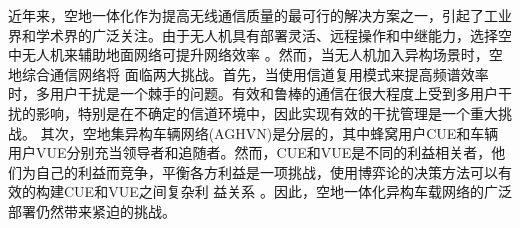近年来，空地一体化作为提高无线通信质量的最可行的解决方案之一，引起了工业界和学术界的广泛关注。由于无人机具有部署灵活、远程操作和中继能力，选择空中无人机来辅助地面网络可提升网络效率 \supercite{ACO}。然而，当无人机加入异构场景时，空地综合通信网络将
面临两大挑战。首先，当使用信道复用模式来提高频谱效率时，多用户干扰是一个棘手的问题。有效和鲁棒的通信在很大程度上受到多用户干扰的影响，特别是在不确定的信道环境中，因此实现有效的干扰管理是一个重大挑战\supercite{CCO}。 其次，空地集异构车辆网络(AGHVN)是分层的，其中蜂窝用户CUE和车辆用户VUE分别充当领导者和追随者。然而，CUE和VUE是不同的利益相关者，他们为自己的利益而竞争，平衡各方利益是一项挑战，使用博弈论的决策方法可以有效的构建CUE和VUE之间复杂利
益关系 \supercite{胡益恺智能车辆决策方法研究综述}。因此，空地一体化异构车载网络的广泛部署仍然带来紧迫的挑战。

